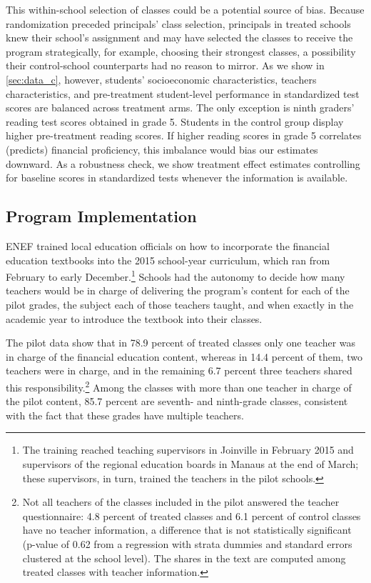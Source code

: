 This within-school selection of classes could be a potential source of bias. Because randomization preceded principals' class selection, principals in treated schools knew their school's assignment and may have selected the classes to receive the program strategically, for example, choosing their strongest classes, a possibility their control-school counterparts had no reason to mirror. As we show in \autoref{sec:data_c}, however, students' socioeconomic characteristics, teachers characteristics, and pre-treatment student-level performance in standardized test scores are balanced across treatment arms. The only exception is ninth graders' reading test scores obtained in grade 5. Students in the control group display higher pre-treatment reading scores. If higher reading scores in grade 5 correlates (predicts) financial proficiency, this imbalance would bias our estimates downward. As a robustness check, we show treatment effect estimates controlling for baseline scores in standardized tests whenever the information is available.  

\subsection{Program Implementation}\label{sec:implementation}

ENEF trained local education officials on how to incorporate the financial education textbooks into the 2015 school-year curriculum, which ran from February to early December.\footnote{The training reached teaching supervisors in Joinville in February 2015 and supervisors of the regional education boards in Manaus at the end of March; these supervisors, in turn, trained the teachers in the pilot schools.} Schools had the autonomy to decide how many teachers would be in charge of delivering the program's content for each of the pilot grades, the subject each of those teachers taught, and when exactly in the academic year to introduce the textbook into their classes.

The pilot data show that in 78.9 percent of treated classes only one teacher was in charge of the financial education content, whereas in 14.4 percent of them, two teachers were in charge, and in the remaining 6.7 percent three teachers shared this responsibility.\footnote{Not all teachers of the classes included in the pilot answered the teacher questionnaire: 4.8 percent of treated classes and 6.1 percent of control classes have no teacher information, a difference that is not statistically significant (p-value of 0.62 from a regression with strata dummies and standard errors clustered at the school level). The shares in the text are computed among treated classes with teacher information.} Among the classes with more than one teacher in charge of the pilot content, 85.7 percent are seventh- and ninth-grade classes, consistent with the fact that these grades have multiple teachers.

